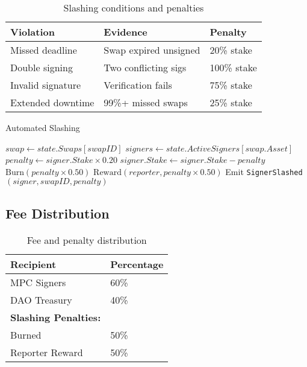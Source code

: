 \documentclass[11pt]{article}
\begin{document}
\begin{table}[h]
\centering
\begin{tabular}{@{}lll@{}}
\toprule
\textbf{Violation} & \textbf{Evidence} & \textbf{Penalty} \\
\midrule
Missed deadline & Swap expired unsigned & 20\% stake \\
Double signing & Two conflicting sigs & 100\% stake \\
Invalid signature & Verification fails & 75\% stake \\
Extended downtime & 99\%+ missed swaps & 25\% stake \\
\bottomrule
\end{tabular}
\caption{Slashing conditions and penalties}
\label{tab:slashing}
\end{table}

\begin{algorithm}[H]
\caption{Automated Slashing}
\begin{algorithmic}[1]
    \State $swap \gets state.Swaps[swapID]$
            \State $signers \gets state.ActiveSigners[swap.Asset]$
                \State $penalty \gets signer.Stake \times 0.20$
                \State $signer.Stake \gets signer.Stake - penalty$
                \State $\text{Burn}(penalty \times 0.50)$
                \State $\text{Reward}(reporter, penalty \times 0.50)$
                \State Emit \texttt{SignerSlashed}$(signer, swapID, penalty)$
            \EndFor
        \EndIf
    \EndIf
\EndFunction
\end{algorithmic}
\end{algorithm}

\subsection{Fee Distribution}

\begin{table}[h]
\centering
\begin{tabular}{@{}ll@{}}
\toprule
\textbf{Recipient} & \textbf{Percentage} \\
\midrule
MPC Signers & 60\% \\
DAO Treasury & 40\% \\
\midrule
\textbf{Slashing Penalties:} & \\
Burned & 50\% \\
Reporter Reward & 50\% \\
\bottomrule
\end{tabular}
\caption{Fee and penalty distribution}
\label{tab:fee-dist}
\end{table}
\end{document}
